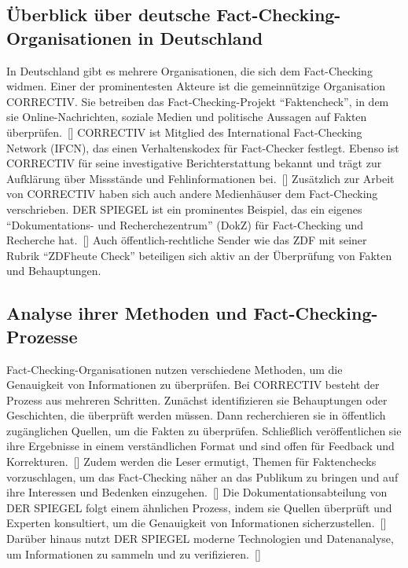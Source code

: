 \documentclass[a4paper,listof=totoc,bibliography=totoc]{scrartcl}
\begin{document}
\subsection{Überblick über deutsche Fact-Checking-Organisationen in Deutschland}

In Deutschland gibt es mehrere Organisationen, die sich dem Fact-Checking widmen. Einer der 
prominentesten Akteure ist die gemeinnützige Organisation CORRECTIV. Sie betreiben das 
Fact-Checking-Projekt ``Faktencheck'', in dem sie Online-Nachrichten, soziale Medien und 
politische Aussagen auf Fakten überprüfen.~[\cite{humprecht2020}] CORRECTIV ist Mitglied 
des International Fact-Checking Network (IFCN), das einen Verhaltenskodex
für Fact-Checker festlegt. Ebenso ist CORRECTIV für seine investigative Berichterstattung 
bekannt und trägt zur Aufklärung über Missstände und Fehlinformationen bei.~[\cite{humprecht2020}] 
\newline
\newline
Zusätzlich zur Arbeit von CORRECTIV haben sich auch andere Medienhäuser dem Fact-Checking verschrieben. 
DER SPIEGEL ist ein prominentes Beispiel, das ein eigenes ``Dokumentations- und Recherchezentrum'' 
(DokZ) für Fact-Checking und Recherche hat.~[\cite{benz2017}] Auch öffentlich-rechtliche Sender wie das 
ZDF mit seiner Rubrik ``ZDFheute Check'' beteiligen sich aktiv an der Überprüfung von Fakten und Behauptungen. 

\subsection{Analyse ihrer Methoden und Fact-Checking-Prozesse}

Fact-Checking-Organisationen nutzen verschiedene Methoden, um die Genauigkeit von Informationen
zu überprüfen. Bei CORRECTIV besteht der Prozess aus mehreren Schritten. Zunächst identifizieren 
sie Behauptungen oder Geschichten, die überprüft werden müssen. Dann recherchieren sie in öffentlich 
zugänglichen Quellen, um die Fakten zu überprüfen. Schließlich veröffentlichen sie ihre Ergebnisse 
in einem verständlichen Format und sind offen für Feedback und Korrekturen.~[\cite{fengler2015}] 
Zudem werden die Leser ermutigt, Themen für Faktenchecks vorzuschlagen, um das Fact-Checking näher 
an das Publikum zu bringen und auf ihre Interessen und Bedenken einzugehen.~[\cite{silverman2009}]
\newline
\newline
Die Dokumentationsabteilung von DER SPIEGEL folgt einem ähnlichen Prozess, indem sie Quellen überprüft 
und Experten konsultiert, um die Genauigkeit von Informationen sicherzustellen.~[\cite{benz2017}] 
Darüber hinaus nutzt DER SPIEGEL moderne Technologien und Datenanalyse, um Informationen zu sammeln 
und zu verifizieren.~[\cite{benz2017}] 
\end{document}
